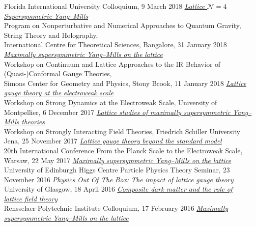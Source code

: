 \begin{spacelistout}
\begin{revnumerate}
      Florida International University Colloquium, 9 March 2018
    \pagebreakitem
      \textit{\href{http://www.davidschaich.net/talks/1801Bangalore.pdf}{Lattice $\mathcal N = 4$ Supersymmetric Yang--Mills}} \\
      Program on Nonperturbative and Numerical Approaches to Quantum Gravity, String Theory and Holography, \\ International Centre for Theoretical Sciences, Bangalore, 31 January 2018
    \pagebreakitem
      \textit{\href{http://www.davidschaich.net/talks/1801StonyBrook.pdf}{Maximally supersymmetric Yang--Mills on the lattice}} \\
      Workshop on Continuum and Lattice Approaches to the IR Behavior of (Quasi-)Conformal Gauge Theories, \\ Simons Center for Geometry and Physics, Stony Brook, 11 January 2018
    \pagebreakitem
      \textit{\href{http://www.davidschaich.net/talks/1712Montpellier.pdf}{Lattice gauge theory at the electroweak scale}} \\
      Workshop on Strong Dynamics at the Electroweak Scale, University of Montpellier, 6 December 2017
    \pagebreakitem
      \textit{\href{http://www.davidschaich.net/talks/1711Jena.pdf}{Lattice studies of maximally supersymmetric Yang--Mills theories}} \\
      Workshop on Strongly Interacting Field Theories, Friedrich Schiller University Jena, 25 November 2017
    \pagebreakitem
      \textit{\href{http://www.davidschaich.net/talks/1705Planck.pdf}{Lattice gauge theory beyond the standard model}} \\
      20th International Conference From the Planck Scale to the Electroweak Scale, Warsaw, 22 May 2017
    \pagebreakitem
      \textit{\href{http://www.davidschaich.net/talks/1611Edinburgh.pdf}{Maximally supersymmetric Yang--Mills on the lattice}} \\
      University of Edinburgh Higgs Centre Particle Physics Theory Seminar, 23 November 2016
    \pagebreakitem
      \textit{\href{http://www.davidschaich.net/talks/1604Glasgow.pdf}{Physics Out Of The Box: The impact of lattice gauge theory}} \\
      University of Glasgow, 18 April 2016
    \pagebreakitem
      \textit{\href{http://www.davidschaich.net/talks/1602RPI.pdf}{Composite dark matter and the role of lattice field theory}} \\
      Rensselaer Polytechnic Institute Colloquium, 17 February 2016
    \pagebreakitem
      \textit{\href{http://www.davidschaich.net/talks/1512Jena.pdf}{Maximally supersymmetric Yang--Mills on the lattice}} \\

\end{revnumerate}
\end{spacelistout}

